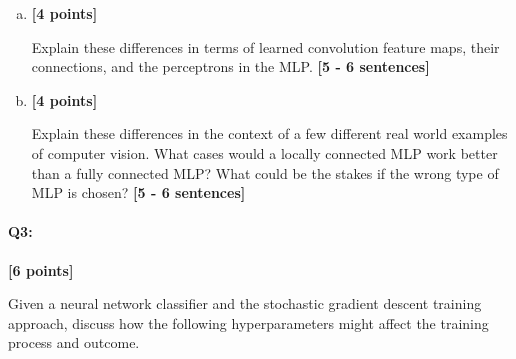 \begin{enumerate} [(a)]
\item \textbf{[4 points]} 
\begin{tcolorbox}[colback=orange!5!white,colframe=orange!75!black]
Explain these differences in terms of learned convolution feature maps, their connections, and the perceptrons in the MLP. \textbf{[5 - 6 sentences]}
\end{tcolorbox}


\pagebreak
\item \textbf{[4 points]}
\begin{tcolorbox}[colback=orange!5!white,colframe=orange!75!black]
Explain these differences in the context of a few different real world examples of computer vision. What cases would a locally connected MLP work better than a fully connected MLP? What could be the stakes if the wrong type of MLP is chosen? \textbf{[5 - 6 sentences]}
\end{tcolorbox}


\end{enumerate}


\pagebreak
\paragraph{Q3:} \textbf{[6 points]} 
\begin{tcolorbox}[colback=orange!5!white,colframe=orange!75!black]
Given a neural network classifier and the stochastic gradient descent training approach, discuss how the following hyperparameters might affect the training process and outcome.
\end{tcolorbox}

